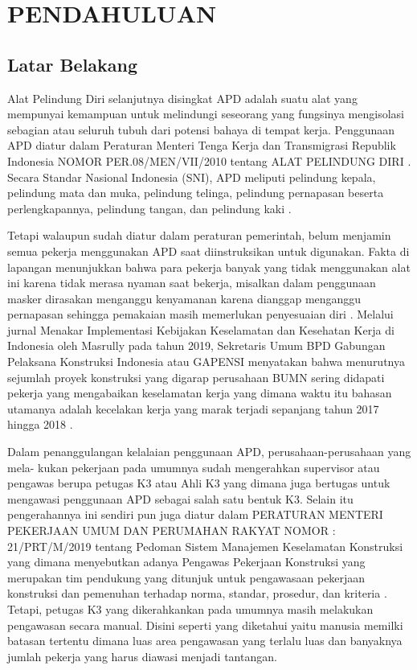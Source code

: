 \section{PENDAHULUAN}

\subsection{Latar Belakang}

Alat Pelindung Diri selanjutnya disingkat APD adalah suatu alat yang mempunyai kemampuan untuk melindungi
seseorang yang fungsinya mengisolasi sebagian atau
seluruh tubuh dari potensi bahaya di tempat kerja.
Penggunaan APD diatur dalam Peraturan Menteri Tenga Kerja
dan Transmigrasi Republik Indonesia NOMOR PER.08/MEN/VII/2010
tentang ALAT PELINDUNG DIRI \cite{suratkementriantenagakerja}.
Secara Standar Nasional Indonesia (SNI), APD meliputi pelindung kepala, pelindung mata dan muka, pelindung telinga,
pelindung pernapasan beserta perlengkapannya, pelindung tangan, dan pelindung kaki \cite{suratkementriantenagakerja}.

Tetapi walaupun sudah diatur dalam peraturan pemerintah, belum menjamin semua pekerja menggunakan APD saat diinstruksikan untuk digunakan. Fakta di lapangan menunjukkan bahwa para pekerja banyak yang tidak menggunakan alat ini karena tidak merasa nyaman saat bekerja, misalkan dalam penggunaan masker dirasakan menganggu kenyamanan karena dianggap menganggu pernapasan sehingga pemakaian masih memerlukan penyesuaian diri \cite{sumamur2014}. Melalui jurnal Menakar Implementasi Kebijakan Keselamatan dan Kesehatan Kerja di Indonesia oleh Masrully pada tahun 2019, Sekretaris Umum BPD Gabungan Pelaksana Konstruksi Indonesia atau GAPENSI menyatakan bahwa menurutnya sejumlah proyek konstruksi yang digarap perusahaan BUMN sering didapati pekerja yang mengabaikan keselamatan kerja yang dimana waktu itu bahasan utamanya adalah kecelakan kerja yang marak terjadi sepanjang tahun 2017 hingga 2018 \cite{masrully2019menakar}.

Dalam penanggulangan kelalaian penggunaan APD, perusahaan-perusahaan yang mela- kukan pekerjaan pada umumnya sudah mengerahkan supervisor atau pengawas berupa petugas K3 atau Ahli K3 yang dimana juga bertugas untuk mengawasi penggunaan APD sebagai salah satu bentuk K3. Selain itu pengerahannya  ini sendiri pun juga diatur dalam PERATURAN MENTERI PEKERJAAN UMUM DAN PERUMAHAN RAKYAT NOMOR : 21/PRT/M/2019 tentang Pedoman Sistem Manajemen Keselamatan Konstruksi yang dimana menyebutkan adanya Pengawas Pekerjaan Konstruksi yang merupakan tim pendukung yang ditunjuk untuk pengawasaan pekerjaan konstruksi dan pemenuhan terhadap norma, standar, prosedur, dan kriteria \cite{permen21prtm2019pedomansistemmanajemenkeselamatankonstruksi}. Tetapi, petugas K3 yang dikerahkankan pada umumnya masih melakukan pengawasan secara manual. Disini seperti yang diketahui yaitu manusia memilki batasan tertentu dimana luas area pengawasan yang terlalu luas dan banyaknya jumlah pekerja yang harus diawasi menjadi tantangan.

